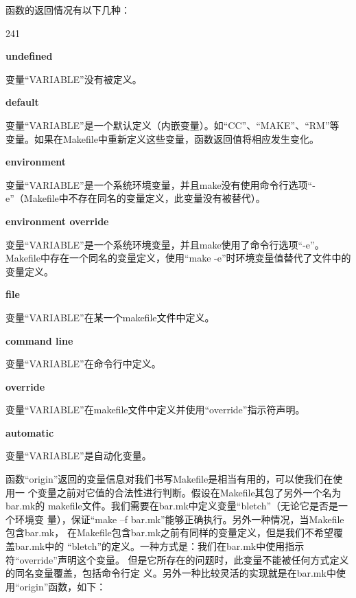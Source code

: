 函数的返回情况有以下几种：
\begin{dinglist}{241}
\itemsep=4pt \parskip=0pt
\item \textbf{undefined}

变量“VARIABLE”没有被定义。

\item \textbf{default}

变量“VARIABLE”是一个默认定义（内嵌变量）。如“CC”、“MAKE”、“RM”等%
变量。如果在Makefile中重新定义这些变量，函数返回值将相应发生变化。

\item \textbf{environment}

变量“VARIABLE”是一个系统环境变量，并且make没有使用命令行选项“-e”（Makefile中不存在同名的变量定义，此变量没有被替代）。

\item \textbf{environment override} %

变量“VARIABLE”是一个系统环境变量，并且make使用了命令行选项“-e”。Makefile中存在一个同名的变量定义，使用“make -e”时环境变量值替代了文件中的变量定义。

\item \textbf{file}

变量“VARIABLE”在某一个makefile文件中定义。

\item \textbf{command line} %

变量“VARIABLE”在命令行中定义。

\item \textbf{override} %

变量“VARIABLE”在makefile文件中定义并使用“override”指示符声明。

\item \textbf{automatic} %

变量“VARIABLE”是自动化变量。

\end{dinglist}

函数“origin”返回的变量信息对我们书写Makefile是相当有用的，可以使我们在使用一
个变量之前对它值的合法性进行判断。假设在Makefile其包了另外一个名为bar.mk的
makefile文件。我们需要在bar.mk中定义变量“bletch”（无论它是否是一个环境变
量），保证“make –f bar.mk”能够正确执行。另外一种情况，当Makefile包含bar.mk，
在Makefile包含bar.mk之前有同样的变量定义，但是我们不希望覆盖bar.mk中的
“bletch”的定义。一种方式是：我们在bar.mk中使用指示符“override”声明这个变量。
但是它所存在的问题时，此变量不能被任何方式定义的同名变量覆盖，包括命令行定
义。另外一种比较灵活的实现就是在bar.mk中使用“origin”函数，如下：


